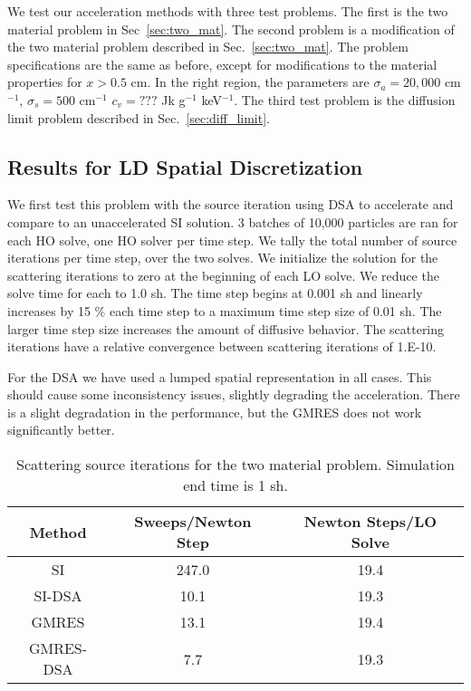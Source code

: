 {We test our acceleration methods with three test problems.  The first is the two material
problem in Sec~\ref{sec:two_mat}.  The second problem is a modification of the two material problem described in
Sec.~\ref{sec:two_mat}. The problem specifications are the same as before, except for
modifications to the material properties for $x>0.5$ cm.  In the right region, the
parameters are $\sigma_a = 20,000$ cm$^{-1}$, $\sigma_s=500 $ cm$^{-1}$ $c_v =??? $ Jk
g$^{-1}$ keV$^{-1}$.  The third test problem is the diffusion limit problem described in
Sec.~\ref{sec:diff_limit}.

\subsection{Results for LD Spatial Discretization}

We first test this problem with the source iteration using DSA to accelerate and compare
to an unaccelerated SI solution.  3 batches of 10,000 particles are ran for each HO
solve, one HO solver per time step.  We tally the total number of source iterations per
time step, over the two solves.  We initialize the solution for the scattering iterations to zero at the beginning of
each LO solve.  We reduce the solve time for each to 1.0 sh.  The time step begins at
0.001 sh and linearly increases by 15 \% each time step to a maximum time step size of
0.01 sh.  The larger time step size increases the amount of diffusive behavior.  The
scattering iterations have a relative convergence between scattering iterations of 1.E-10.

For the DSA we have used a lumped spatial representation in all cases.  This should cause
some inconsistency issues, slightly degrading the acceleration.  There is a slight
degradation in the performance, but the GMRES does not work significantly better.

\begin{table}
    \caption{\label{tab:twomat_dsa_iters} Scattering source iterations for the two
material problem.  Simulation end time is 1 sh.}
    \begin{tabular}{|ccc|} \hline
        Method & Sweeps/Newton Step & Newton Steps/LO Solve \\ \hline
        SI     & 247.0 & 19.4                \\
        SI-DSA & 10.1   & 19.3      \\
        GMRES  & 13.1    &  19.4     \\
        GMRES-DSA & 7.7  &  19.3  \\ \hline
    \end{tabular}
\end{table}



}
